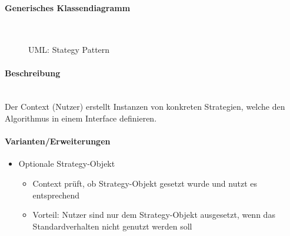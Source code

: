 \documentclass[
    ngerman,
    color=3b,
    summary,
    boxarc,
    main,
]{rubos-tuda-template}
\begin{document}
\paragraph{Generisches Klassendiagramm}\mbox{}\\
\begin{figure}[ht]
    \centering
    \caption{UML: Stategy Pattern}
\end{figure}

\paragraph{Beschreibung}\mbox{}\\
Der Context (Nutzer) erstellt Instanzen von konkreten Strategien, welche den Algorithmus in einem Interface definieren.

\paragraph{Varianten/Erweiterungen}\mbox{}\par
\begin{itemize}
    \item Optionale Strategy-Objekt
          \begin{itemize}
              \item Context prüft, ob Strategy-Objekt gesetzt wurde und nutzt es entsprechend
              \item Vorteil: Nutzer sind nur dem Strategy-Objekt ausgesetzt, wenn das Standardverhalten nicht genutzt werden soll
          \end{itemize}
\end{itemize}
\end{document}
